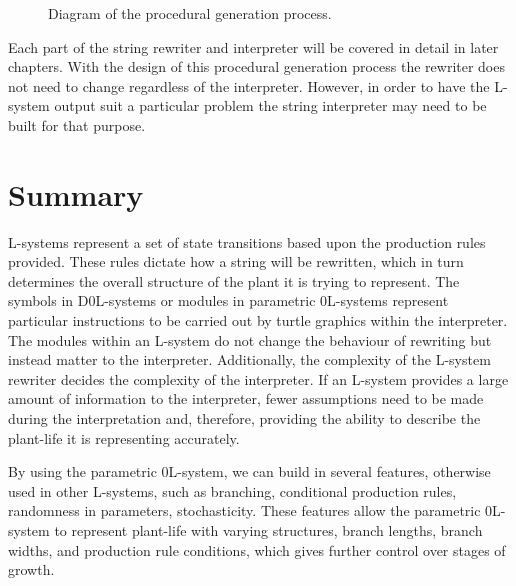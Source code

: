 \begin{figure}[htbp]
	{\centering
		\setlength{\fboxrule}{1pt}
		\vspace{7px}
		\caption{Diagram of the procedural generation process.}
	}
\end{figure}
\FloatBarrier

\noindent
Each part of the string rewriter and interpreter will be covered in detail in later chapters. With the design of this procedural generation process the rewriter does not need to change regardless of the interpreter. However, in order to have the L-system output suit a particular problem the string interpreter may need to be built for that purpose.


\section{Summary}

L-systems represent a set of state transitions based upon the production rules provided. These rules dictate how a string will be rewritten, which in turn determines the overall structure of the plant it is trying to represent. The symbols in D0L-systems or modules in parametric 0L-systems represent particular instructions to be carried out by turtle graphics within the interpreter. The modules within an L-system do not change the behaviour of rewriting but instead matter to the interpreter. Additionally, the complexity of the L-system rewriter decides the complexity of the interpreter. If an L-system provides a large amount of information to the interpreter, fewer assumptions need to be made during the interpretation and, therefore, providing the ability to describe the plant-life it is representing accurately.

By using the parametric 0L-system, we can build in several features, otherwise used in other L-systems, such as branching, conditional production rules, randomness in parameters, stochasticity. These features allow the parametric 0L-system to represent plant-life with varying structures, branch lengths, branch widths, and production rule conditions, which gives further control over stages of growth.


